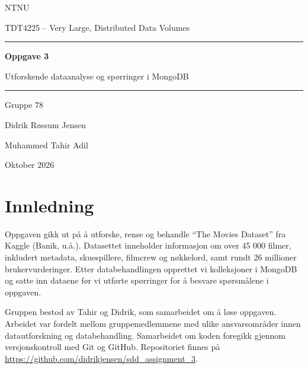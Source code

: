 \documentclass[11pt,a4paper]{article}
\begin{document}
\begin{titlepage}
  \centering
  \vspace*{3cm}
  {\large NTNU \par}
  \vspace{0.4em}
  {\large TDT4225 -- Very Large, Distributed Data Volumes \par}
  \vspace{2.5cm}
  {\color{aksent}\rule{\linewidth}{0.8pt}}
  \vspace{1em}
  {\Huge\bfseries Oppgave 3 \par}
  \vspace{0.6em}
  {\Large Utforskende dataanalyse og spørringer i MongoDB \par}
  \vspace{1em}
  {\color{aksent}\rule{\linewidth}{0.8pt}}
  \vspace{2.5cm}
  {\large Gruppe 78 \par}
  \vspace{0.8em}
  {\large Didrik Røssum Jensen \par}
  {\large Muhammed Tahir Adil \par}
  \vfill
  {\color{gray} Oktober 2026 \par}
\end{titlepage}

\tableofcontents
\newpage

\section{Innledning}
Oppgaven gikk ut på å utforske, rense og behandle \enquote{The Movies Dataset} fra Kaggle (Banik, u.å.). Datasettet inneholder informasjon om over 45 000 filmer, inkludert metadata, skuespillere, filmcrew og nøkkelord, samt rundt 26 millioner brukervurderinger. Etter databehandlingen opprettet vi kolleksjoner i MongoDB og satte inn dataene før vi utførte spørringer for å besvare spørsmålene i oppgaven.

Gruppen bestod av Tahir og Didrik, som samarbeidet om å løse oppgaven. Arbeidet var fordelt mellom gruppemedlemmene med ulike ansvarsområder innen datautforskning og databehandling. Samarbeidet om koden foregikk gjennom versjonskontroll med Git og GitHub. Repositoriet finnes på \url{https://github.com/didrikjensen/sdd_assignment_3}.
\end{document}
